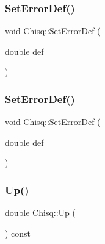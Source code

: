\mbox{\label{classChisq_a0707a4c0241bb82e81d2c5a9c1a303d7}} 
\subsubsection{\texorpdfstring{SetErrorDef()}{SetErrorDef()}\hspace{0.1cm}{\footnotesize\ttfamily [1/2]}}
{\footnotesize\ttfamily void Chisq\+::\+Set\+Error\+Def (\begin{DoxyParamCaption}\item[{double}]{def }\end{DoxyParamCaption})\hspace{0.3cm}{\ttfamily [inline]}}

\mbox{\label{classChisq_a0707a4c0241bb82e81d2c5a9c1a303d7}} 
\subsubsection{\texorpdfstring{SetErrorDef()}{SetErrorDef()}\hspace{0.1cm}{\footnotesize\ttfamily [2/2]}}
{\footnotesize\ttfamily void Chisq\+::\+Set\+Error\+Def (\begin{DoxyParamCaption}\item[{double}]{def }\end{DoxyParamCaption})\hspace{0.3cm}{\ttfamily [inline]}}

\mbox{\label{classChisq_a3cc0c9f3bf8b806ce836537bc3d94686}} 
\subsubsection{\texorpdfstring{Up()}{Up()}\hspace{0.1cm}{\footnotesize\ttfamily [1/2]}}
{\footnotesize\ttfamily double Chisq\+::\+Up (\begin{DoxyParamCaption}{ }\end{DoxyParamCaption}) const\hspace{0.3cm}{\ttfamily [inline]}}

\mbox{\label{classChisq_a3cc0c9f3bf8b806ce836537bc3d94686}} 
